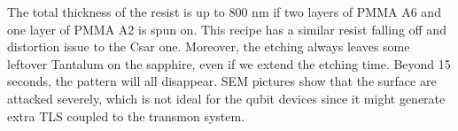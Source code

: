 The total thickness of the resist is up to 800 nm if two layers of PMMA A6 and one layer of PMMA A2 is spun on. This recipe has a similar resist falling off and distortion issue to the Csar one. Moreover, the etching always leaves some leftover Tantalum on the sapphire, even if we extend the etching time. Beyond 15 seconds, the pattern will all disappear. SEM pictures show that the surface are attacked severely, which is not ideal for the qubit devices since it might generate extra TLS coupled to the transmon system.
